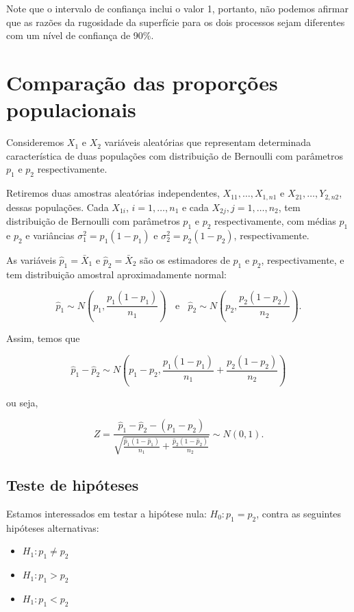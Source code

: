 \documentclass[
]{book}
\providecommand{\tightlist}{%
  \setlength{\itemsep}{0pt}\setlength{\parskip}{0pt}}
\begin{document}
Note que o intervalo de confiança inclui o valor 1, portanto, não podemos afirmar que as razões da rugosidade da superfície para os dois processos sejam diferentes com um nível de confiança de 90\%.

\hypertarget{comparauxe7uxe3o-das-proporuxe7uxf5es-populacionais}{%
\section{Comparação das proporções populacionais}\label{comparauxe7uxe3o-das-proporuxe7uxf5es-populacionais}}

Consideremos \(X_1\) e \(X_2\) variáveis aleatórias que representam determinada característica de duas populações com distribuição de Bernoulli com parâmetros \(p_1\) e \(p_2\) respectivamente.

Retiremos duas amostras aleatórias independentes, \(X_{11},\ldots,X_{1,n1}\) e \(X_{21},\ldots,Y_{2,n2}\), dessas populações. Cada \(X_{1i}\), \(i=1,\ldots,n_1\) e cada \(X_{2j}, j=1,\ldots,n_2\), tem distribuição de Bernoulli com parâmetros \(p_1\) e \(p_2\) respectivamente, com médias \(p_1\) e \(p_2\) e variâncias \(\sigma^2_1=p_1(1-p_1)\) e \(\sigma^2_2=p_2(1-p_2)\), respectivamente.

As variáveis \(\hat p_1=\bar X_1\) e \(\hat p_2=\bar X_2\) são os estimadores de \(p_1\) e \(p_2\), respectivamente, e tem distribuição amostral aproximadamente normal:

\[\hat p_1\sim N\left(p_1,\frac{p_1(1-p_1)}{n_1}\right)~~~~\text{e}~~~~\hat p_2\sim N\left(p_2,\frac{p_2(1-p_2)}{n_2}\right).\]

Assim, temos que

\[\hat p_1-\hat p_2\sim N\left(p_1-p_2,\frac{p_1(1-p_1)}{n_1}+\frac{p_2(1-p_2)}{n_2}\right)\]

ou seja,

\[Z=\frac{\hat p_1-\hat p_2 - (p_1-p_2)}{\sqrt{\frac{\hat p_1(1-\hat p_1)}{n_1}+\frac{\hat p_2(1-\hat p_2)}{n_2}}}\sim N(0,1).\]

\hypertarget{teste-de-hipuxf3teses-3}{%
\subsection{Teste de hipóteses}\label{teste-de-hipuxf3teses-3}}

Estamos interessados em testar a hipótese nula: \(H_0: p_1=p_2\), contra as seguintes hipóteses alternativas:

\begin{itemize}
\tightlist
\item
  \(H_1: p_1\ne p_2\)
\item
  \(H_1: p_1>p_2\)
\item
  \(H_1: p_1<p_2\)
\end{itemize}
\end{document}
